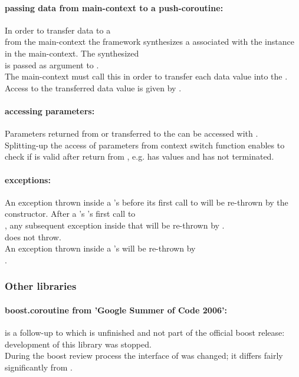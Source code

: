 \paragraph*{passing data from main-context to a push-coroutine:}
In order to transfer data to a\\
\pushcoro from the main-context the framework synthesizes a \pullcoro associated
with the \pushcoro instance in the main-context. The synthesized\\
\pullcoro is passed as argument to \corofunction.\\
The main-context must call this \pushcoroop in order to transfer each data value
into the \corofunction.\\
Access to the transferred data value is given by \pullcoroget.

\paragraph*{accessing parameters:}
Parameters returned from or transferred to the \corofunction can be accessed
with \pullcoroget.\\
\newline
Splitting-up the access of parameters from context switch function enables to
check if \pullcoro is valid after return from \pullcoroop, e.g. \pullcoro has
values and \corofunction has not terminated.

\paragraph*{exceptions:}
An exception thrown inside a \pullcoro's \corofunction before its first call to
\pushcoroop will be re-thrown by the \pullcoro constructor. After a \pullcoro's
\corofunction's first call to\\
\pushcoroop, any subsequent exception inside that
\corofunction will be re-thrown by \pullcoroop.\\
\pullcoroget does not throw.\\
\newline
An exception thrown inside a \pushcoro's \corofunction will be re-thrown by\\
\pushcoroop.


\subsubsection*{Other libraries}
\paragraph*{boost.coroutine from 'Google Summer of Code 2006':}
\boostcoroutine is a follow-up to \boostcorosum which is unfinished and
not part of the official boost release: development of this library was
stopped.\\
During the boost review process the interface of \boostcoroutine was changed; it
differs fairly significantly from \boostcorosum.

